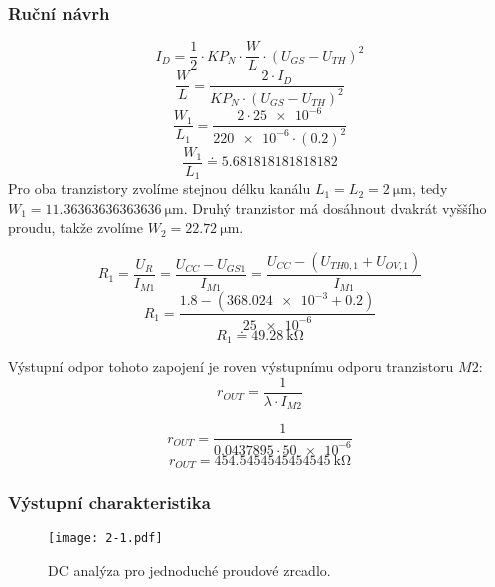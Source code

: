 \subsubsection{Ruční návrh}
\[
    I_D=\frac{1}{2} \cdot K P_N \cdot \frac{W}{L} \cdot\left(U_{G S}-U_{T H}\right)^2
\]
\[
    \frac{W}{L}=\frac{2\cdot I_{D}}{KP_{N}\cdot (U_{GS} -U_{TH})^2 } 
\]
\[
    \frac{W_{1} }{L_{1} }=\frac{2\cdot \num{25e-6}}{\num{220e-6}\cdot (\num{0.2})^2 } 
\]
\[
    \frac{W_{1} }{L_{1} }\doteq \num[round-mode=places,round-precision=2]{5.681818181818182} 
\]
Pro oba tranzistory zvolíme stejnou délku kanálu \(L_{1}=L_{2} = \qty{2}{\micro\meter}\), tedy \(W_{1} =\qty[round-mode=places,round-precision=2]{11,36363636363636}{\micro\meter}\). Druhý tranzistor má dosáhnout dvakrát vyššího proudu, takže zvolíme \(W_{2} =\qty{22,72}{\micro\meter}\).

\[
    R_1=\frac{U_R}{I_{M 1}}=\frac{U_{C C}-U_{G S 1}}{I_{M 1}}=\frac{U_{C C}-\left(U_{T H 0,1}+U_{O V, 1}\right)}{I_{M 1}}
\]
\[
    R_1=\frac{\num{1.8}-\left(\num{368,024e-3}+\num{0.2}\right)}{\num{25e-6}}
\]
\[
    R_{1} \doteq \qty{49,28}{\kilo\ohm}
\]

Výstupní odpor tohoto zapojení je roven výstupnímu odporu tranzistoru \(M2\): 
\[
    r_{O U T}=\frac{1}{\lambda \cdot I_{M 2}}
\]

\[
    r_{O U T}=\frac{1}{\num[round-mode=places,round-precision=3]{0,0437895} \cdot \num{50e-6}}
\]
\[
    r_{O U T}=\qty[round-mode=places,round-precision=3]{454,5454545454545}{\kilo\ohm}
\]

\subsubsection{Výstupní charakteristika}
\begin{figure}[h!]
    \centering
    \texttt{[image: 2-1.pdf]}
    \caption{DC analýza pro jednoduché proudové zrcadlo.}
    \label{fig:2-1-pdf}
\end{figure}

